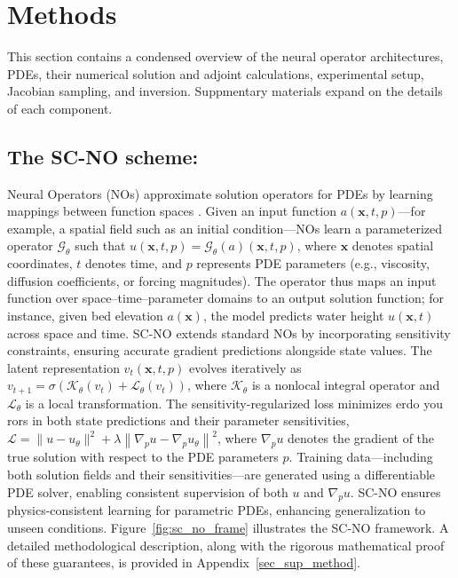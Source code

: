 \section{Methods}
This section contains a condensed overview of the neural operator architectures, PDEs, their numerical solution and adjoint calculations, experimental setup, Jacobian sampling, and inversion. Suppmentary materials expand on the details of each component.
\subsection{The SC-NO scheme:} 
Neural Operators (NOs) approximate solution operators for PDEs by learning mappings between function spaces \citep{lu2021learning, kovachki2023neural}. Given an input function \( a(\mathbf{x}, t, p) \)—for example, a spatial field such as an initial condition—NOs learn a parameterized operator \( \mathcal{G}_\theta \) such that \( u(\mathbf{x}, t, p) = \mathcal{G}_\theta(a)(\mathbf{x}, t, p) \), where \( \mathbf{x} \) denotes spatial coordinates, \( t \) denotes time, and \( p \) represents PDE parameters (e.g., viscosity, diffusion coefficients, or forcing magnitudes). The operator thus maps an input function over space--time--parameter domains to an output solution function; for instance, given bed elevation \( a(\mathbf{x}) \), the model predicts water height \( u(\mathbf{x}, t) \) across space and time. SC-NO extends standard NOs by incorporating sensitivity constraints, ensuring accurate gradient predictions alongside state values. The latent representation \( v_t(\mathbf{x}, t, p) \) evolves iteratively as
\( v_{t+1} = \sigma\!\left( \mathcal{K}_\theta(v_t) + \mathcal{L}_\theta(v_t) \right) \),
where \( \mathcal{K}_\theta \) is a nonlocal integral operator and \( \mathcal{L}_\theta \) is a local transformation. The sensitivity-regularized loss minimizes erdo you rors in both state predictions and their parameter sensitivities,
\( \mathcal{L} = \| u - u_{\theta} \|^2 + \lambda \left\| \nabla_{p} u - \nabla_{p} u_{\theta} \right\|^2 \),
where \( \nabla_{p} u \) denotes the gradient of the true solution with respect to the PDE parameters \( p \). Training data—including both solution fields and their sensitivities—are generated using a differentiable PDE solver, enabling consistent supervision of both \( u \) and \( \nabla_{p} u \). SC-NO ensures physics-consistent learning for parametric PDEs, enhancing generalization to unseen conditions. Figure~\ref{fig:sc_no_frame} illustrates the SC-NO framework. A detailed methodological description, along with the rigorous mathematical proof of these guarantees, is provided in Appendix~\ref{sec_sup_method}.


